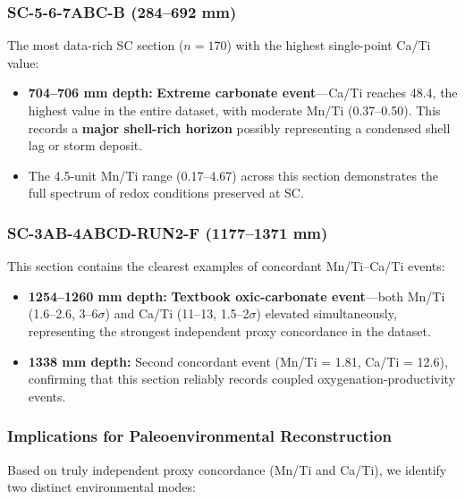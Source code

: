 \subsubsection{SC-5-6-7ABC-B (284--692 mm)}

The most data-rich SC section ($n = 170$) with the highest single-point Ca/Ti value:

\begin{itemize}
\item \textbf{704--706 mm depth:} \textbf{Extreme carbonate event}---Ca/Ti reaches 48.4, the highest value in the entire dataset, with moderate Mn/Ti (0.37--0.50). This records a \textbf{major shell-rich horizon} possibly representing a condensed shell lag or storm deposit.

\item The 4.5-unit Mn/Ti range (0.17--4.67) across this section demonstrates the full spectrum of redox conditions preserved at SC.
\end{itemize}

\subsubsection{SC-3AB-4ABCD-RUN2-F (1177--1371 mm)}

This section contains the clearest examples of concordant Mn/Ti--Ca/Ti events:

\begin{itemize}
\item \textbf{1254--1260 mm depth:} \textbf{Textbook oxic-carbonate event}---both Mn/Ti (1.6--2.6, 3--6$\sigma$) and Ca/Ti (11--13, 1.5--2$\sigma$) elevated simultaneously, representing the strongest independent proxy concordance in the dataset.

\item \textbf{1338 mm depth:} Second concordant event (Mn/Ti = 1.81, Ca/Ti = 12.6), confirming that this section reliably records coupled oxygenation-productivity events.
\end{itemize}

\subsubsection{Implications for Paleoenvironmental Reconstruction}

Based on truly independent proxy concordance (Mn/Ti and Ca/Ti), we identify two distinct environmental modes:

